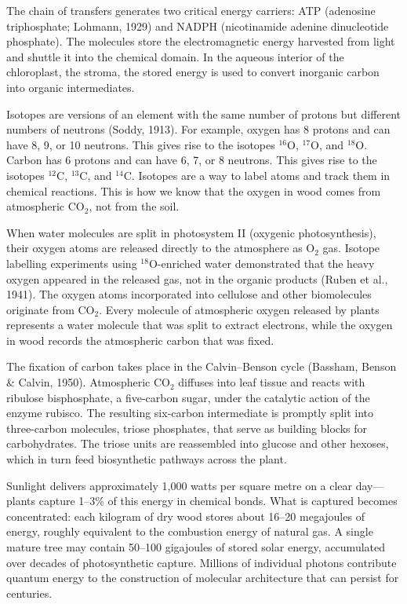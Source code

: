 The chain of transfers generates two critical energy carriers: ATP (adenosine triphosphate; Lohmann, 1929) and NADPH (nicotinamide adenine dinucleotide phosphate). The molecules store the electromagnetic energy harvested from light and shuttle it into the chemical domain. In the aqueous interior of the chloroplast, the stroma, the stored energy is used to convert inorganic carbon into organic intermediates.

Isotopes are versions of an element with the same number of protons but different numbers of neutrons (Soddy, 1913). For example, oxygen has 8 protons and can have 8, 9, or 10 neutrons. This gives rise to the isotopes $^{16}\mathrm{O}$, $^{17}\mathrm{O}$, and $^{18}\mathrm{O}$. Carbon has 6 protons and can have 6, 7, or 8 neutrons. This gives rise to the isotopes $^{12}\mathrm{C}$, $^{13}\mathrm{C}$, and $^{14}\mathrm{C}$. Isotopes are a way to label atoms and track them in chemical reactions. This is how we know that the oxygen in wood comes from atmospheric $\mathrm{CO}_2$, not from the soil.

When water molecules are split in photosystem II (oxygenic photosynthesis), their oxygen atoms are released directly to the atmosphere as \(\mathrm{O}_2\) gas. Isotope labelling experiments using $^{18}\mathrm{O}$-enriched water demonstrated that the heavy oxygen appeared in the released gas, not in the organic products (Ruben et al., 1941). The oxygen atoms incorporated into cellulose and other biomolecules originate from \(\mathrm{CO}_2\). Every molecule of atmospheric oxygen released by plants represents a water molecule that was split to extract electrons, while the oxygen in wood records the atmospheric carbon that was fixed.

The fixation of carbon takes place in the Calvin–Benson cycle (Bassham, Benson \& Calvin, 1950). Atmospheric \(\mathrm{CO}_2\) diffuses into leaf tissue and reacts with ribulose bisphosphate, a five-carbon sugar, under the catalytic action of the enzyme rubisco. The resulting six-carbon intermediate is promptly split into three-carbon molecules, triose phosphates, that serve as building blocks for carbohydrates. The triose units are reassembled into glucose and other hexoses, which in turn feed biosynthetic pathways across the plant.

Sunlight delivers approximately 1,000 watts per square metre on a clear day—plants capture 1–3\% of this energy in chemical bonds. What is captured becomes concentrated: each kilogram of dry wood stores about 16–20 megajoules of energy, roughly equivalent to the combustion energy of natural gas. A single mature tree may contain 50–100 gigajoules of stored solar energy, accumulated over decades of photosynthetic capture. Millions of individual photons contribute quantum energy to the construction of molecular architecture that can persist for centuries.

